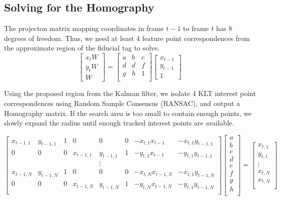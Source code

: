 \documentclass[letterpaper,10pt,conference]{IEEEtran}
\begin{document}
\subsection{Solving for the Homography}
The projecton matrix mapping coordinates in frame $t-1$ to frame $t$ has 8 degrees of freedom. Thus, we need at least 4 feature point correspondences from the approximate region of the fiducial tag to solve. 
\begin{equation}
\begin{bmatrix}
x_{t}W\\
y_{t}W\\
W
\end{bmatrix}
= \begin{bmatrix}
a&b&c\\
d&d&f\\
g&h&1\\
\end{bmatrix}
\begin{bmatrix}
x_{t-1}\\
y_{t-1}\\
1
\end{bmatrix}
\end{equation}

Using the proposed region from the Kalman filter, we isolate 4 KLT interest point correspondences using Random Sample Consensus (RANSAC), and output a Homography matrix. If the search area is too small to contain enough points, we slowly expand the radius until enough tracked interest points are available.

\begin{equation}
\begin{bmatrix}
x_{t-1,1}& y_{t-1,1}&1&0&0&0 &-x_{t,1}x_{t-1}& -x_{t,1}y_{t-1,1}\\
0&0&0&x_{t-1,1}& y_{t-1,1}&1& -y_{t,1}x_{t-1} &-y_{t,1}y_{t-1,1}\\
&&&&\vdots&&\\
x_{t-1,N}& y_{t-1,N}&1&0&0&0& -x_{t,N}x_{t-1,N}& -x_{t,1}y_{t-1,N}\\
0&0&0&x_{t-1,N}& y_{t-1,N}&1& -y_{t,N}x_{t-1,N}& -y_{t,1}y_{t-1,N}\\
\end{bmatrix}
\begin{bmatrix}
a\\
b\\
c\\
d\\
e\\
f\\
g\\
h\\
\end{bmatrix} = 
\begin{bmatrix}
x_{t,1}\\
y_{t,1}\\
\vdots\\
x_{t,N}\\
x_{t,N}\\
\end{bmatrix}
\end{equation}
\end{document}
